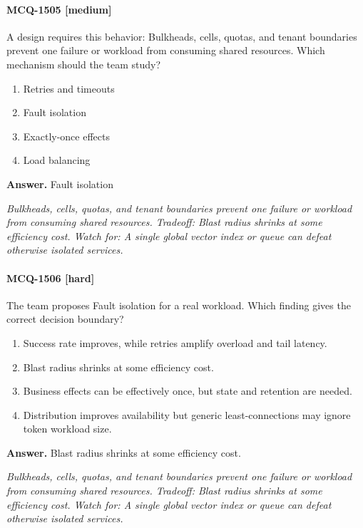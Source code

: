 \paragraph{MCQ-1505 [medium]} A design requires this behavior: Bulkheads, cells, quotas, and tenant boundaries prevent one failure or workload from consuming shared resources. Which mechanism should the team study?
\begin{enumerate}[label=\Alph*.]
\item Retries and timeouts
\item Fault isolation
\item Exactly-once effects
\item Load balancing
\end{enumerate}
\noindent\textbf{Answer.} Fault isolation
\par\textit{Bulkheads, cells, quotas, and tenant boundaries prevent one failure or workload from consuming shared resources. Tradeoff: Blast radius shrinks at some efficiency cost. Watch for: A single global vector index or queue can defeat otherwise isolated services.}
\paragraph{MCQ-1506 [hard]} The team proposes Fault isolation for a real workload. Which finding gives the correct decision boundary?
\begin{enumerate}[label=\Alph*.]
\item Success rate improves, while retries amplify overload and tail latency.
\item Blast radius shrinks at some efficiency cost.
\item Business effects can be effectively once, but state and retention are needed.
\item Distribution improves availability but generic least-connections may ignore token workload size.
\end{enumerate}
\noindent\textbf{Answer.} Blast radius shrinks at some efficiency cost.
\par\textit{Bulkheads, cells, quotas, and tenant boundaries prevent one failure or workload from consuming shared resources. Tradeoff: Blast radius shrinks at some efficiency cost. Watch for: A single global vector index or queue can defeat otherwise isolated services.}

